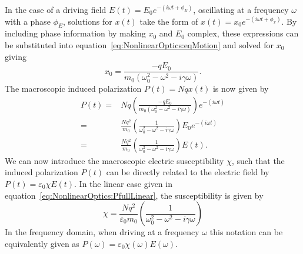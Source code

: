 In the case of a driving field $E(t) = E_0 e^{-(i\omega t + \phi_E)}$, oscillating at a frequency $\omega$ with a phase $\phi_E$, solutions for $x(t)$ take the form of $x(t) = x_0 e^{-(i\omega t + \phi_x)}$. By including phase information by making $x_0$ and $E_0$ complex, these expressions can be substituted into equation~\ref{eq:NonlinearOptics:eqMotion} and solved for $x_0$ giving
\begin{equation}\label{eq:NonlinearOptics:x0}
	x_0 = \frac{-q E_0}{m_0 (\omega_{0}^2 -\omega^2 -i \gamma \omega)}.
\end{equation}
The macroscopic induced polarization $P(t) = N q x(t)$ is now given by
\begin{equation}\label{eq:NonlinearOptics:PfullLinear}
	\begin{split}
		P(t) = & N q \left( \frac{-q E_0}{m_0 (\omega_{0}^2 -\omega^2 -i \gamma \omega)} \right) e^{-(i\omega t)} \\
		= & \frac{N q^2}{m_0} \left( \frac{1}{\omega_{0}^2 -\omega^2 -i \gamma \omega} \right) E_0 e^{-(i\omega t)} \\
		= & \frac{N q^2}{m_0} \left( \frac{1}{\omega_{0}^2 -\omega^2 -i \gamma \omega} \right) E(t).
	\end{split}
\end{equation}
We can now introduce the macroscopic electric susceptibility $\chi$, such that the induced polarization $P(t)$ can be directly related to the electric field by $P(t) = \varepsilon_0 \chi E(t)$. In the linear case given in equation~\ref{eq:NonlinearOptics:PfullLinear}, the susceptibility is given by
\begin{equation}\label{eq:NonlinearOptics:chiFullLinear}
		\chi = \frac{N q^2}{\varepsilon_0 m_0} \left( \frac{1}{\omega_{0}^2 -\omega^2 -i \gamma \omega} \right)
\end{equation}
In the frequency domain, when driving at a frequency $\omega$ this notation can be equivalently given as $P(\omega) = \varepsilon_0 \chi(\omega) E(\omega)$.

